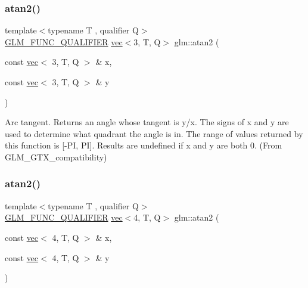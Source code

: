 \mbox{\label{group__gtx__compatibility_gac39314f5087e7e51e592897cabbc1927}} 
\subsubsection{\texorpdfstring{atan2()}{atan2()}\hspace{0.1cm}{\footnotesize\ttfamily [3/4]}}
{\footnotesize\ttfamily template$<$typename T , qualifier Q$>$ \\
\hyperlink{setup_8hpp_a33fdea6f91c5f834105f7415e2a64407}{G\+L\+M\+\_\+\+F\+U\+N\+C\+\_\+\+Q\+U\+A\+L\+I\+F\+I\+ER} \hyperlink{structglm_1_1vec}{vec}$<$3, T, Q$>$ glm\+::atan2 (\begin{DoxyParamCaption}\item[{const \hyperlink{structglm_1_1vec}{vec}$<$ 3, T, Q $>$ \&}]{x,  }\item[{const \hyperlink{structglm_1_1vec}{vec}$<$ 3, T, Q $>$ \&}]{y }\end{DoxyParamCaption})}



Arc tangent. Returns an angle whose tangent is y/x. The signs of x and y are used to determine what quadrant the angle is in. The range of values returned by this function is \mbox{[}-\/\+PI, PI\mbox{]}. Results are undefined if x and y are both 0. (From G\+L\+M\+\_\+\+G\+T\+X\+\_\+compatibility) 

\mbox{\label{group__gtx__compatibility_gaba86c28da7bf5bdac64fecf7d56e8ff3}} 
\subsubsection{\texorpdfstring{atan2()}{atan2()}\hspace{0.1cm}{\footnotesize\ttfamily [4/4]}}
{\footnotesize\ttfamily template$<$typename T , qualifier Q$>$ \\
\hyperlink{setup_8hpp_a33fdea6f91c5f834105f7415e2a64407}{G\+L\+M\+\_\+\+F\+U\+N\+C\+\_\+\+Q\+U\+A\+L\+I\+F\+I\+ER} \hyperlink{structglm_1_1vec}{vec}$<$4, T, Q$>$ glm\+::atan2 (\begin{DoxyParamCaption}\item[{const \hyperlink{structglm_1_1vec}{vec}$<$ 4, T, Q $>$ \&}]{x,  }\item[{const \hyperlink{structglm_1_1vec}{vec}$<$ 4, T, Q $>$ \&}]{y }\end{DoxyParamCaption})}



